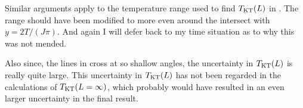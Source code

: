 \documentclass[11pt,letter, swedish, english
]{article}
\begin{document}
Similar arguments apply to the temperature range used to find
$T_{\text{KT}}(L)$ in . The range should have been modified
to more even around the intersect with $y=2T/(J\pi)$. And again I will
defer back to my time situation as to why this was not mended. 

Also since, the lines in  cross at so shallow
angles, the uncertainty in $T_{\text{KT}}(L)$ is really quite large. This
uncertainty in $T_{\text{KT}}(L)$ has not been regarded in the calculations of
$T_{\text{KT}}(L=\infty)$, which probably would have resulted in an even larger
uncertainty in the final result. 











\end{document}
